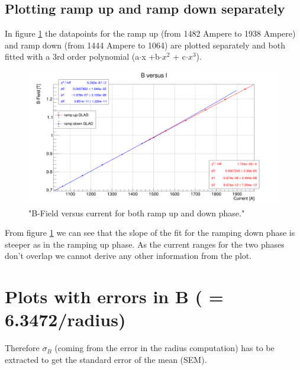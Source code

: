 \documentclass[12pt, letterpaper]{article}
\begin{document}
\subsection{Plotting ramp up and ramp down separately}
In figure \ref{fig:ramp_up_down} the datapoints for the ramp up (from 1482 Ampere to 1938 Ampere) and ramp down (from 1444 Ampere to 1064) are plotted separately and both fitted with a 3rd order polynomial (a$\cdot$x +b$\cdot x^{2}$ + c$\cdot x^{3}$).
\begin{figure}[!htbp]
	\centering
	\includegraphics[width=.9\linewidth]{ramp_up_down.png}
	\caption{"B-Field versus current for both ramp up and down phase."}
	\label{fig:ramp_up_down}
\end{figure}

From figure \ref{fig:ramp_up_down} we can see that the slope of the fit for the ramping down phase is steeper as in the ramping up phase. As the current ranges for the two phases don't overlap we cannot derive any other information from the plot. 
\section{Plots with errors in B ( = 6.3472/radius)}
Therefore $\sigma_{B}$ (coming from the error in the radius computation) has to be extracted to get the standard error of the mean (SEM).\\
\end{document}
